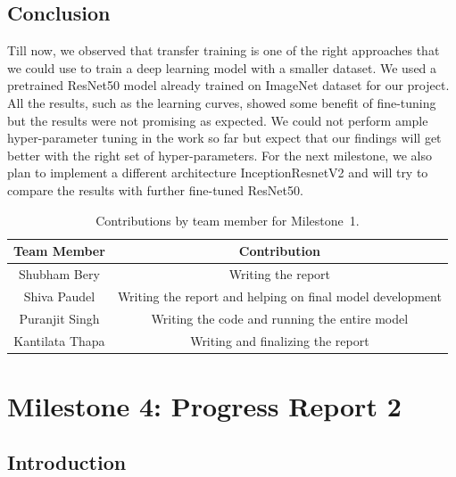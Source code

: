 \documentclass{report}
\begin{document}
\section{Conclusion}

Till now, we observed that transfer training is one of the right approaches that we could use to train a deep learning model with a smaller dataset. We used a pretrained ResNet50 model already trained on ImageNet dataset for our project. All the results, such as the learning curves, showed some benefit of fine-tuning but the results were not promising as expected. We could not perform ample hyper-parameter tuning in the work so far but expect that our findings will get better with the right set of hyper-parameters. For the next milestone, we also plan to implement a different architecture InceptionResnetV2 and will try to compare the results with further fine-tuned ResNet50.


\begin{table}[H]
    \caption{Contributions by team member for Milestone~1.}
    \centering
    \begin{tabular}{|c|c|} \hline
    {\bf Team Member}     &  {\bf Contribution}  \\ \hline
    Shubham Bery     & Writing the report \\
    Shiva Paudel    & Writing the report and helping on final model development\\
    Puranjit Singh     & Writing the code and running the entire model\\
    Kantilata Thapa     & Writing and finalizing the report\\ \hline
    \end{tabular}
    \label{tab:contribution1}
\end{table}


\chapter{Milestone 4: Progress Report 2}


\section{Introduction}
\end{document}
